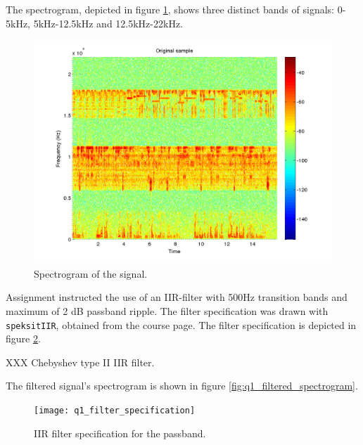 The spectrogram, depicted in figure \ref{fig:q1_spectrogram}, shows
three distinct bands of signals: 0-5kHz, 5kHz-12.5kHz and 12.5kHz-22kHz.

\begin{figure}
  \begin{center}
    \hspace*{-1in}
    \includegraphics[width=180mm]{q1_spectrogram}
    \caption{Spectrogram of the signal. \label{fig:q1_spectrogram}}
  \end{center}  
\end{figure}

Assignment instructed the use of an IIR-filter with 500Hz transition
bands and maximum of 2 dB passband ripple.  The filter specification was
drawn with {\tt speksitIIR}, obtained from the course page.  The filter
specification is depicted in figure \ref{fig:q1_filter_specification}.

XXX Chebyshev type II IIR filter.

The filtered signal's spectrogram is shown in figure
\ref{fig:q1_filtered_spectrogram}.

\begin{figure}
  \begin{center}
    \hspace*{-1in}
    \texttt{[image: q1\_filter\_specification]}
    \caption{IIR filter specification for the
      passband. \label{fig:q1_filter_specification}}
  \end{center}  
\end{figure}

